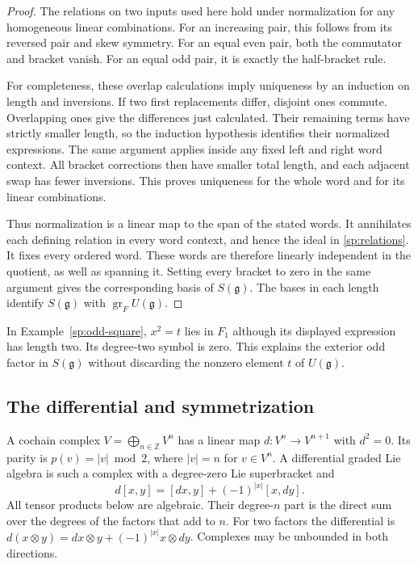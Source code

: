\begin{proof}
The relations on two inputs used here hold under normalization for any
homogeneous linear combinations.  For an increasing pair, this follows
from its reversed pair and skew symmetry.  For an equal even pair,
both the commutator and bracket vanish.  For an equal odd pair, it is
exactly the half-bracket rule.

For completeness, these overlap calculations imply uniqueness by an
induction on length and inversions.  If two first replacements differ,
disjoint ones commute.  Overlapping ones give the differences just
calculated.  Their remaining terms have strictly smaller length, so the
induction hypothesis identifies their normalized expressions.  The same
argument applies inside any fixed left and right word context.
All bracket corrections then have smaller total length, and each
adjacent swap has fewer inversions.  This proves uniqueness for the
whole word and for its linear combinations.

Thus normalization is a linear map to the span of the stated words.
It annihilates each defining relation in every word context, and hence
the ideal in \eqref{sp:relations}.  It fixes every ordered word.
These words are therefore linearly independent in the quotient, as
well as spanning it.  Setting every bracket to zero in the same
argument gives the corresponding basis of $S(\mathfrak g)$.
The bases in each length identify $S(\mathfrak g)$ with
$\operatorname{gr}_F U(\mathfrak g)$.
\end{proof}

In Example~\ref{sp:odd-square}, $x^2=t$ lies in $F_1$ although its
displayed expression has length two.  Its degree-two symbol is zero.
This explains the exterior odd factor in $S(\mathfrak g)$ without
discarding the nonzero element $t$ of $U(\mathfrak g)$.

\subsection{The differential and symmetrization}
\label{sp:differential-section}

A cochain complex $V=\bigoplus_{n\in\mathbb Z}V^n$ has a linear map
$d:V^n\to V^{n+1}$ with $d^2=0$.
Its parity is $p(v)=|v|\bmod2$, where $|v|=n$ for $v\in V^n$.
A differential graded Lie algebra is such a complex with a
degree-zero Lie superbracket and
\[
 d[x,y]=[dx,y]+(-1)^{|x|}[x,dy].
\]
All tensor products below are algebraic.  Their degree-$n$ part is the
direct sum over the degrees of the factors that add to $n$.
For two factors the differential is
$d(x\otimes y)=dx\otimes y+(-1)^{|x|}x\otimes dy$.
Complexes may be unbounded in both directions.

